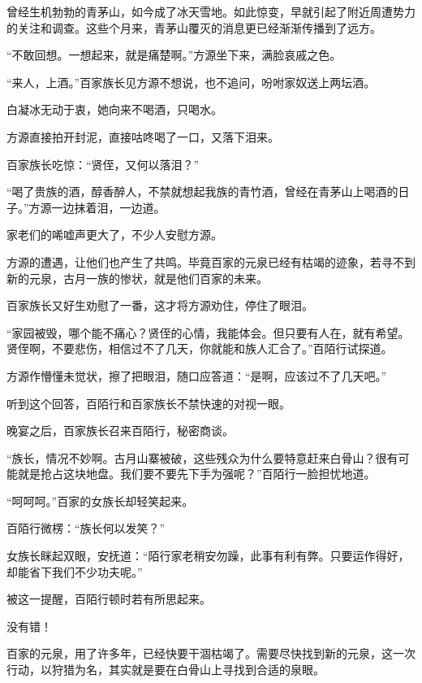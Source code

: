 
\begin{this_body}



曾经生机勃勃的青茅山，如今成了冰天雪地。如此惊变，早就引起了附近周遭势力的关注和调查。这些个月来，青茅山覆灭的消息更已经渐渐传播到了远方。

“不敢回想。一想起来，就是痛楚啊。”方源坐下来，满脸哀戚之色。

“来人，上酒。”百家族长见方源不想说，也不追问，吩咐家奴送上两坛酒。

白凝冰无动于衷，她向来不喝酒，只喝水。

方源直接拍开封泥，直接咕咚喝了一口，又落下泪来。

百家族长吃惊：“贤侄，又何以落泪？”

“喝了贵族的酒，醇香醉人，不禁就想起我族的青竹酒，曾经在青茅山上喝酒的日子。”方源一边抹着泪，一边道。

家老们的唏嘘声更大了，不少人安慰方源。

方源的遭遇，让他们也产生了共鸣。毕竟百家的元泉已经有枯竭的迹象，若寻不到新的元泉，古月一族的惨状，就是他们百家的未来。

百家族长又好生劝慰了一番，这才将方源劝住，停住了眼泪。

“家园被毁，哪个能不痛心？贤侄的心情，我能体会。但只要有人在，就有希望。贤侄啊，不要悲伤，相信过不了几天，你就能和族人汇合了。”百陌行试探道。

方源作懵懂未觉状，擦了把眼泪，随口应答道：“是啊，应该过不了几天吧。”

听到这个回答，百陌行和百家族长不禁快速的对视一眼。

晚宴之后，百家族长召来百陌行，秘密商谈。

“族长，情况不妙啊。古月山寨被破，这些残众为什么要特意赶来白骨山？很有可能就是抢占这块地盘。我们要不要先下手为强呢？”百陌行一脸担忧地道。

“呵呵呵。”百家的女族长却轻笑起来。

百陌行微楞：“族长何以发笑？”

女族长眯起双眼，安抚道：“陌行家老稍安勿躁，此事有利有弊。只要运作得好，却能省下我们不少功夫呢。”

被这一提醒，百陌行顿时若有所思起来。

没有错！

百家的元泉，用了许多年，已经快要干涸枯竭了。需要尽快找到新的元泉，这一次行动，以狩猎为名，其实就是要在白骨山上寻找到合适的泉眼。


\end{this_body}
